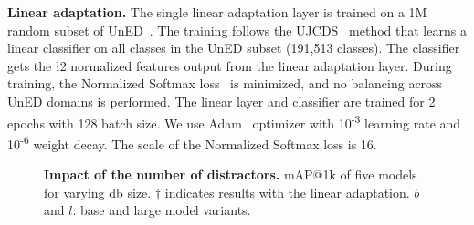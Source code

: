 \noindent\textbf{Linear adaptation.}
The single linear adaptation layer is trained on a 1M random subset of UnED~\cite{ycc+23}.
The training follows the UJCDS~\cite{ycc+23} method that learns a linear classifier on all classes in the UnED subset (191,513 classes). The classifier gets the \l2 normalized features output from the linear adaptation layer.
During training, the Normalized Softmax loss~\cite{zw18} is minimized, and no balancing across UnED domains is performed.
The linear layer and classifier are trained for 2 epochs with 128 batch size. We use Adam~\cite{kb15} optimizer with 10\textsuperscript{-3} learning rate and 10\textsuperscript{-6} weight decay. The scale of the Normalized Softmax loss is 16.

\begin{figure}[t]
    \centering
    \vspace{-5pt}
    
    \vspace{-12pt}
    \caption{\textbf{Impact of the number of distractors.} mAP@1k of five models for varying db size. $\dagger$ indicates results with the linear adaptation. $b$ and $l$: base and large model variants.
    \label{fig:number_of_distractors}
    \vspace{-13pt}
    }
\end{figure}

